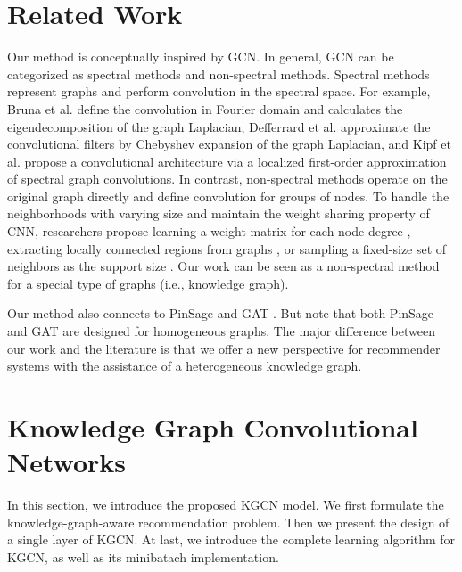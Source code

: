 \documentclass[sigconf]{acmart}
\begin{document}
\section{Related Work}
	Our method is conceptually inspired by GCN.
	In general, GCN can be categorized as spectral methods and non-spectral methods.
	Spectral methods represent graphs and perform convolution in the spectral space.
	For example, Bruna et al. \cite{bruna2014spectral} define the convolution in Fourier domain and calculates the eigendecomposition of the graph Laplacian,
	Defferrard et al. \cite{defferrard2016convolutional} approximate the convolutional filters by Chebyshev expansion of the graph Laplacian,
	and Kipf et al. \cite{kipf2017semi} propose a convolutional architecture via a localized first-order approximation of spectral graph convolutions.
	In contrast, non-spectral methods operate on the original graph directly and define convolution for groups of nodes.
	To handle the neighborhoods with varying size and maintain the weight sharing property of CNN, researchers propose learning a weight matrix for each node degree \cite{duvenaud2015convolutional}, extracting locally connected regions from graphs \cite{niepert2016learning}, or sampling a fixed-size set of neighbors as the support size \cite{hamilton2017inductive}.
	Our work can be seen as a non-spectral method for a special type of graphs (i.e., knowledge graph).
	
	Our method also connects to PinSage \cite{ying2018graph} and GAT \cite{velickovic2017graph}.
	But note that both PinSage and GAT are designed for homogeneous graphs.
	The major difference between our work and the literature is that we offer a new perspective for recommender systems with the assistance of a heterogeneous knowledge graph.
	
	
	
\section{Knowledge Graph Convolutional Networks}
	In this section, we introduce the proposed KGCN model.
	We first formulate the knowledge-graph-aware recommendation problem.
	Then we present the design of a single layer of KGCN.
	At last, we introduce the complete learning algorithm for KGCN, as well as its minibatach implementation.
	
\end{document}
